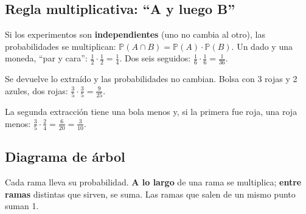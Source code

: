 \subsection{Regla multiplicativa: ``A y luego B''}
Si los experimentos son \textbf{independientes} (uno no cambia al otro), las probabilidades se multiplican: $\mathbb{P}(A\cap B) = \mathbb{P}(A)\cdot\mathbb{P}(B)$. Un dado y una moneda, ``par y cara'': $\frac12\cdot\frac12 = \frac14$. Dos seis seguidos: $\frac16\cdot\frac16 = \frac{1}{36}$.

\begin{minipage}[t]{0.48\linewidth}\vspace{0pt}
\begin{clave} Se devuelve lo extraído y las probabilidades no cambian. Bolsa con 3 rojas y 2 azules, dos rojas: $\frac35\cdot\frac35 = \frac{9}{25}$.\end{clave}
\end{minipage}\hfill
\begin{minipage}[t]{0.48\linewidth}\vspace{0pt}
\begin{ojo} La segunda extracción tiene una bola menos y, si la primera fue roja, una roja menos: $\frac35\cdot\frac24 = \frac{6}{20} = \frac{3}{10}$.\end{ojo}
\end{minipage}

\subsection{Diagrama de árbol}
Cada rama lleva su probabilidad. \textbf{A lo largo} de una rama se multiplica; \textbf{entre ramas} distintas que sirven, se suma. Las ramas que salen de un mismo punto suman 1.

